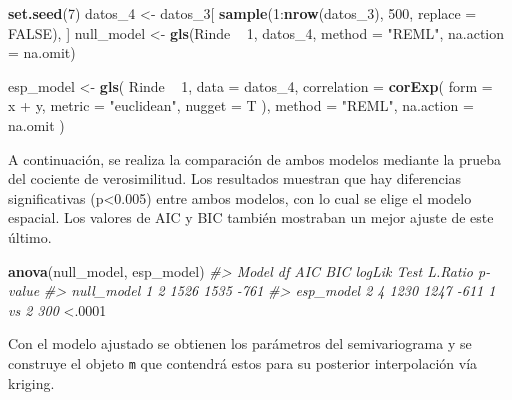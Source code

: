 \documentclass[11pt,b5paper,]{krantz}
\newenvironment{Shaded}{}{}
\newcommand{\KeywordTok}[1]{\textcolor[rgb]{0.00,0.44,0.13}{\textbf{#1}}}
\newcommand{\DataTypeTok}[1]{\textcolor[rgb]{0.56,0.13,0.00}{#1}}
\newcommand{\DecValTok}[1]{\textcolor[rgb]{0.25,0.63,0.44}{#1}}
\newcommand{\StringTok}[1]{\textcolor[rgb]{0.25,0.44,0.63}{#1}}
\newcommand{\CommentTok}[1]{\textcolor[rgb]{0.38,0.63,0.69}{\textit{#1}}}
\newcommand{\OtherTok}[1]{\textcolor[rgb]{0.00,0.44,0.13}{#1}}
\newcommand{\OperatorTok}[1]{\textcolor[rgb]{0.40,0.40,0.40}{#1}}
\newcommand{\NormalTok}[1]{#1}
\begin{document}
\begin{Shaded}
\begin{Highlighting}[]
\KeywordTok{set.seed}\NormalTok{(}\DecValTok{7}\NormalTok{)}
\NormalTok{datos_}\DecValTok{4}\NormalTok{ <-}\StringTok{ }\NormalTok{datos_}\DecValTok{3}\NormalTok{[}
  \KeywordTok{sample}\NormalTok{(}\DecValTok{1}\OperatorTok{:}\KeywordTok{nrow}\NormalTok{(datos_}\DecValTok{3}\NormalTok{), }
         \DecValTok{500}\NormalTok{, }\DataTypeTok{replace =} \OtherTok{FALSE}\NormalTok{), ]}
\NormalTok{null_model <-}
\StringTok{  }\KeywordTok{gls}\NormalTok{(Rinde }\OperatorTok{~}\StringTok{ }\DecValTok{1}\NormalTok{, datos_}\DecValTok{4}\NormalTok{, }
      \DataTypeTok{method =} \StringTok{"REML"}\NormalTok{, }
      \DataTypeTok{na.action =}\NormalTok{ na.omit)}

\NormalTok{esp_model <-}\StringTok{ }\KeywordTok{gls}\NormalTok{(}
\NormalTok{  Rinde }\OperatorTok{~}\StringTok{ }\DecValTok{1}\NormalTok{,}
  \DataTypeTok{data =}\NormalTok{ datos_}\DecValTok{4}\NormalTok{,}
  \DataTypeTok{correlation =} \KeywordTok{corExp}\NormalTok{(}
    \DataTypeTok{form =}  \OperatorTok{~}\StringTok{ }\NormalTok{x }\OperatorTok{+}\StringTok{ }\NormalTok{y,}
    \DataTypeTok{metric =} \StringTok{"euclidean"}\NormalTok{,}
    \DataTypeTok{nugget =}\NormalTok{ T}
\NormalTok{  ),}
  \DataTypeTok{method =} \StringTok{"REML"}\NormalTok{,}
  \DataTypeTok{na.action =}\NormalTok{ na.omit}
\NormalTok{)}
\end{Highlighting}
\end{Shaded}

A continuación, se realiza la comparación de ambos modelos mediante la
prueba del cociente de verosimilitud. Los resultados muestran que hay
diferencias significativas (p\textless{}0.005) entre ambos modelos, con
lo cual se elige el modelo espacial. Los valores de AIC y BIC también
mostraban un mejor ajuste de este último.

\begin{Shaded}
\begin{Highlighting}[]
\KeywordTok{anova}\NormalTok{(null_model, esp_model)}
\CommentTok{#> Model df AIC BIC logLik Test L.Ratio p-value}
\CommentTok{#> null_model 1 2 1526 1535 -761}
\CommentTok{#> esp_model 2 4 1230 1247 -611 1 vs 2 300}
\OperatorTok{<}\NormalTok{.}\DecValTok{0001}
\end{Highlighting}
\end{Shaded}

Con el modelo ajustado se obtienen los parámetros del semivariograma y
se construye el objeto \texttt{m} que contendrá estos para su posterior
interpolación vía kriging.
\end{document}
